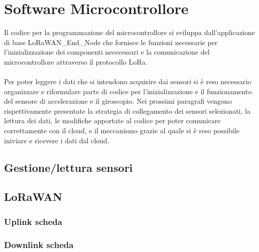 \section{Software Microcontrollore}
Il codice per la programmazione del microcontrollore si sviluppa dall'applicazione di base LoRaWAN\_End\_Node che fornisce
le funzioni necessarie per l'inizializzazione dei componenti nececessari e la comunicazione del microcontrollore attraverso il protocollo LoRa.
\\\\Per poter leggere i dati che si intendono acquisire dai sensori si è reso necessario organizzare e riformulare parte di codice per l'inizializzazione e il funzionamento del sensore
di accelerazione e il giroscopio. Nei prossimi paragrafi vengono rispettivamente presentate la strategia di collegamento dei sensori selezionati, la lettura dei dati, 
le modifiche apportate al codice per poter comunicare correttamente con il cloud, e il meccanismo grazie al quale si è reso possibile iniviare e ricevere i dati dal cloud.

\subsection{Gestione/lettura sensori}



\subsection{LoRaWAN}
  
  \subsubsection{Uplink scheda}


  \subsubsection{Downlink scheda}



